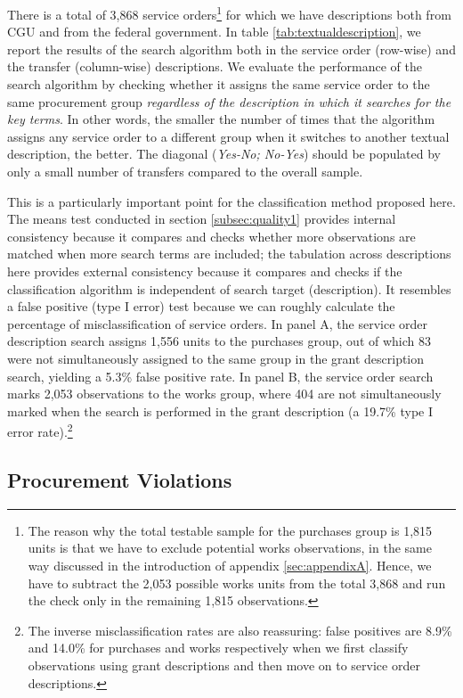 \documentclass[11pt]{article}
\begin{document}
There is a total of 3,868 service orders\footnote{The reason why the total testable sample for the purchases group is 1,815 units is that we have to exclude potential works observations, in the same way discussed in the introduction of appendix \ref{sec:appendixA}. Hence, we have to subtract the 2,053 possible works units from the total 3,868 and run the check only in the remaining 1,815 observations.} for which we have descriptions both from CGU and from the federal government. In table \ref{tab:textualdescription}, we report the results of the search algorithm both in the service order (row-wise) and the transfer (column-wise) descriptions. We evaluate the performance of the search algorithm by checking whether it assigns the same service order to the same procurement group \emph{regardless of the description in which it searches for the key terms}. In other words, the smaller the number of times that the algorithm assigns any service order to a different group when it switches to another textual description, the better. The diagonal (\emph{Yes-No; No-Yes}) should be populated by only a small number of transfers compared to the overall sample.

This is a particularly important point for the classification method proposed here. The means test conducted in section \ref{subsec:quality1} provides internal consistency because it compares and checks whether more observations are matched when more search terms are included; the tabulation across descriptions here provides external consistency because it compares and checks if the classification algorithm is independent of search target (description). It resembles a false positive (type I error) test because we can roughly calculate the percentage of misclassification of service orders. In panel A, the service order description search assigns 1,556 units to the purchases group, out of which 83 were not simultaneously assigned to the same group in the grant description search, yielding a 5.3\% false positive rate. In panel B, the service order search marks 2,053 observations to the works group, where 404 are not simultaneously marked when the search is performed in the grant description (a 19.7\% type I error rate).\footnote{The inverse misclassification rates are also reassuring: false positives are 8.9\% and 14.0\% for purchases and works respectively when we first classify observations using grant descriptions and then move on to service order descriptions.}

\subsection{Procurement Violations}\label{subsec:quality3}
\end{document}
